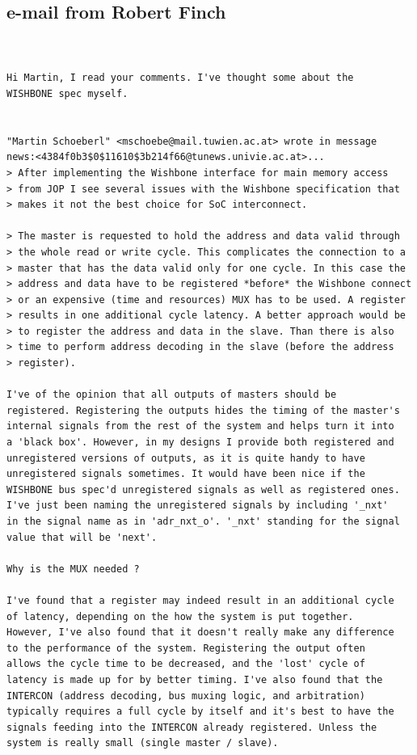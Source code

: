 \documentclass[a4paper,12pt]{scrartcl}
\begin{document}
\subsection{e-mail from Robert Finch}

\begin{verbatim}


Hi Martin, I read your comments. I've thought some about the
WISHBONE spec myself.


"Martin Schoeberl" <mschoebe@mail.tuwien.ac.at> wrote in message
news:<4384f0b3$0$11610$3b214f66@tunews.univie.ac.at>...
> After implementing the Wishbone interface for main memory access
> from JOP I see several issues with the Wishbone specification that
> makes it not the best choice for SoC interconnect.

> The master is requested to hold the address and data valid through
> the whole read or write cycle. This complicates the connection to a
> master that has the data valid only for one cycle. In this case the
> address and data have to be registered *before* the Wishbone connect
> or an expensive (time and resources) MUX has to be used. A register
> results in one additional cycle latency. A better approach would be
> to register the address and data in the slave. Than there is also
> time to perform address decoding in the slave (before the address
> register).

I've of the opinion that all outputs of masters should be
registered. Registering the outputs hides the timing of the master's
internal signals from the rest of the system and helps turn it into
a 'black box'. However, in my designs I provide both registered and
unregistered versions of outputs, as it is quite handy to have
unregistered signals sometimes. It would have been nice if the
WISHBONE bus spec'd unregistered signals as well as registered ones.
I've just been naming the unregistered signals by including '_nxt'
in the signal name as in 'adr_nxt_o'. '_nxt' standing for the signal
value that will be 'next'.

Why is the MUX needed ?

I've found that a register may indeed result in an additional cycle
of latency, depending on the how the system is put together.
However, I've also found that it doesn't really make any difference
to the performance of the system. Registering the output often
allows the cycle time to be decreased, and the 'lost' cycle of
latency is made up for by better timing. I've also found that the
INTERCON (address decoding, bus muxing logic, and arbitration)
typically requires a full cycle by itself and it's best to have the
signals feeding into the INTERCON already registered. Unless the
system is really small (single master / slave).


\end{verbatim}
\end{document}
